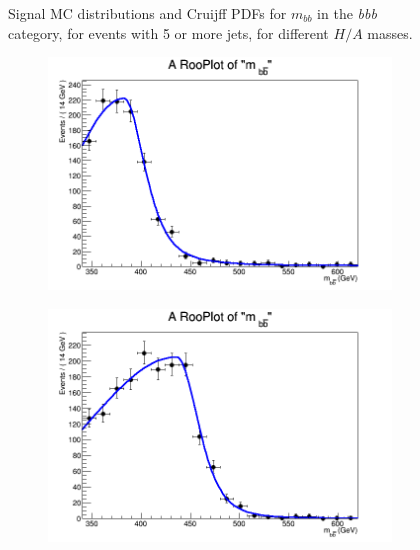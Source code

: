 \begin{figure}[phtb!]
\begin{center}
  \caption{Signal MC distributions and Cruijff PDFs for $m_{bb}$ in the {\it bbb} category, for events with 5 or more jets, for different $H/A$ masses. \label{fig:signalPDFs_5j}}
    \end{center}
\end{figure}







\begin{figure}[phtb!]
  \begin{center}
  \begin{subfigure}[$m_{A}=400$ GeV]{0.4\textwidth}\includegraphics[width=\textwidth]{FitResults/images/fitMC_bAbb400_4.png}\end{subfigure}
  \begin{subfigure}[$m_{A}=450$ GeV]{0.4\textwidth}\includegraphics[width=\textwidth]{FitResults/images/fitMC_bAbb450_4.png}\end{subfigure}

\end{center}
\end{figure}
